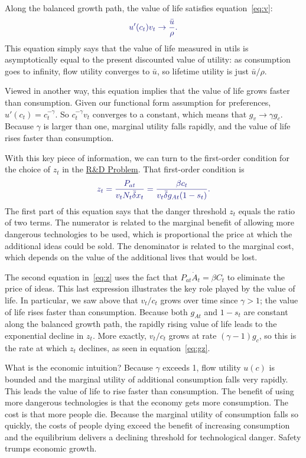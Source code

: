 \documentclass[12pt,twoside]{article}
\newcommand{\clr}[1]{{\color{ChadBlue} #1}}
\begin{document}
Along the balanced growth path, the value of life satisfies
equation~\eqref{eq:v}:
\begin{equation}
\label{eq:vSS}
\clr{ u'(c_t) v_t \rightarrow \frac{\bar{u}}{\rho}. }
\end{equation}
This equation simply says that the value of life measured in utils is
asymptotically equal to the present discounted value of utility: as
consumption goes to infinity, flow utility converges to $\bar{u}$, so
lifetime utility is just $\bar{u}/\rho$.

Viewed in another way, this equation implies that the value of life
grows faster than consumption. Given our functional form assumption for
preferences, $u'(c_t)=c_t ^{-\gamma}$. So $c_t ^{-\gamma} v_t$ converges
to a constant, which means that $g_v \rightarrow \gamma g_c$. Because
$\gamma$ is larger than one, marginal utility falls rapidly, and the
value of life rises faster than consumption.

With this key piece of information, we can turn to the first-order
condition for the choice of $z_t$ in the \hyperlink{RD}{R\&D Problem}.
That first-order condition is
\begin{equation}
\label{eq:z}
\clr{ z_t = \frac{P_{at}}{v_t N_t \bar{\delta} x_t} = \frac{\beta
    c_t}{v_t \bar{\delta} g_{At} (1-s_t)}. }
\end{equation}
The first part of this equation says that the danger threshold $z_t$
equals the ratio of two terms. The numerator is related to the marginal
benefit of allowing more dangerous technologies to be used, which is
proportional the price at which the additional ideas could be sold. The
denominator is related to the marginal cost, which depends on the value
of the additional lives that would be lost.

The second equation in~\eqref{eq:z} uses the fact that $P_{at} \dot{A}_t
= \beta C_t$ to eliminate the price of ideas. This last expression
illustrates the key role played by the value of life. In particular, we
saw above that $v_t/c_t$ grows over time since $\gamma>1$; the value of
life rises faster than consumption. Because both $g_{At}$ and $1-s_t$
are constant along the balanced growth path, the rapidly rising value of
life leads to the exponential decline in $z_t$. More exactly, $v_t/c_t$
grows at rate $(\gamma-1) g_c$, so this is the rate at which $z_t$
declines, as seen in equation~\eqref{eq:gz}.

What is the economic intuition? Because $\gamma$ exceeds 1, flow utility
$u(c)$ is bounded and the marginal utility of additional consumption
falls very rapidly.  This leads the value of life to rise faster than
consumption. The benefit of using more dangerous technologies is that
the economy gets more consumption. The cost is that more people die.
Because the marginal utility of consumption falls so quickly, the costs
of people dying exceed the benefit of increasing consumption and the
equilibrium delivers a declining threshold for technological danger.
Safety trumps economic growth.
\end{document}
